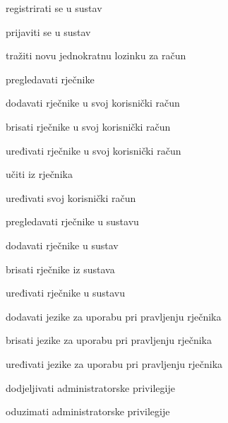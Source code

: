 			
			\begin{packed_enum}
				\item  {}
				
				\begin{packed_enum}
					\item registrirati se u sustav
					\item prijaviti se u sustav
					\item tražiti novu jednokratnu lozinku za račun
				\end{packed_enum}

				
			
				\item  {}
				
				\begin{packed_enum}
					\item pregledavati rječnike
					\item dodavati rječnike u svoj korisnički račun
					\item brisati rječnike u svoj korisnički račun
					\item uređivati rječnike u svoj korisnički račun
					\item učiti iz rječnika
					\item uređivati svoj korisnički račun
					
				\end{packed_enum}

				\item {}
				\begin{packed_enum}
					\item pregledavati rječnike u sustavu
					\item dodavati rječnike u sustav
					\item brisati rječnike iz sustava
					\item uređivati rječnike u sustavu
					\item dodavati jezike za uporabu pri pravljenju rječnika
					\item brisati jezike za uporabu pri pravljenju rječnika
					\item uređivati jezike za uporabu pri pravljenju rječnika
					\item dodjeljivati administratorske privilegije
					\item oduzimati administratorske privilegije
				\end{packed_enum}


\end{packed_enum}
